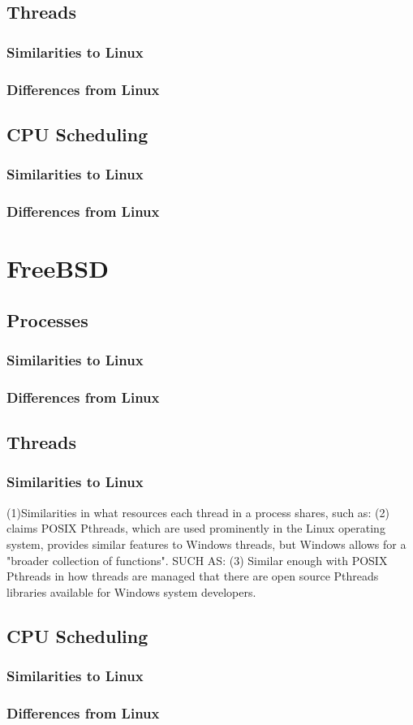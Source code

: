 \documentclass[letterpaper,10pt,titlepage]{article}
\begin{document}
\subsection{Threads}
\subsubsection{Similarities to Linux}
\subsubsection{Differences from Linux}
\subsection{CPU Scheduling}  
\subsubsection{Similarities to Linux}
\subsubsection{Differences from Linux}
\section{FreeBSD}
\subsection{Processes}
\subsubsection{Similarities to Linux}
\subsubsection{Differences from Linux}
\subsection{Threads}
\subsubsection{Similarities to Linux}
(1)Similarities in what resources each thread in a process shares, such as:
(2)\cite{har04} claims POSIX Pthreads, which are used prominently in the Linux operating system, provides similar features to Windows threads, but Windows allows for a "broader collection of functions". SUCH AS:
(3) Similar enough with POSIX Pthreads in how threads are managed that there are open source Pthreads libraries available for Windows system developers.
\subsection{CPU Scheduling}
\subsubsection{Similarities to Linux}
\subsubsection{Differences from Linux}

\newpage
{}

\end{document}
